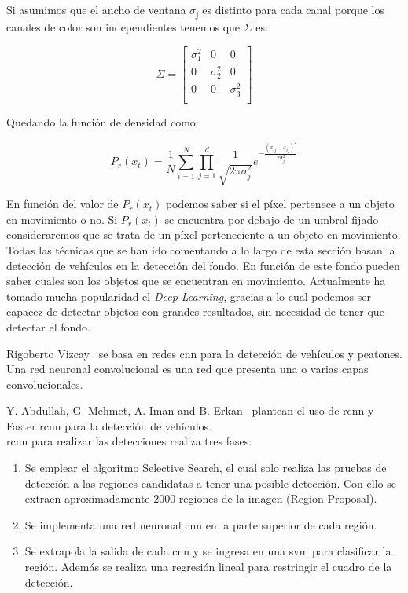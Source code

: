 Si asumimos que el ancho de ventana $\sigma$\textsubscript{j} es distinto para cada canal porque los canales de color son independientes tenemos que $\Sigma$ es:

\begin{equation}\label{matriz_sigma}
   \Sigma = \begin{bmatrix}
            \sigma_{1}^2 & 0 & 0 \\
            0 & \sigma_{2}^2 & 0 \\
            0 & 0 & \sigma_{3}^2 \\
\end{bmatrix}
\end{equation}

Quedando la función de densidad como:

\begin{equation}\label{funcion_densidad}
{P}_{r}(x_{t}) = \frac{1}{N}\sum_{i=1}^{N}\prod_{j=1}^{d}\frac{1}{\sqrt{2\pi\sigma_{j}^2}} e^{-\frac{(x_{tj}-x_{ij})^2}{2\sigma_{j}^2}}
\end{equation}

En función del valor de $P_{
r}(x_{t})$ podemos saber si el píxel pertenece a un objeto en movimiento o no. Si  $P_{
r}(x_{t})$ se encuentra por debajo de un umbral fijado consideraremos que se trata de un píxel perteneciente a un objeto en movimiento.
\\

Todas las técnicas que se han ido comentando a lo largo de esta sección basan la detección de vehículos en la detección del fondo. En función de este fondo pueden saber cuales son los objetos que se encuentran en movimiento. Actualmente ha tomado mucha popularidad el \textit{Deep Learning}, gracias a lo cual podemos ser capacez de detectar objetos con grandes resultados, sin necesidad de tener que detectar el fondo. 

Rigoberto Vizcay~\cite{tesis_rigoberto} se basa en redes \acrfull{cnn} para la detección de vehículos y peatones. Una red neuronal convolucional es una red que presenta una o varias capas convolucionales.

Y. Abdullah, G. Mehmet, A. Iman and B. Erkan~\cite{rcnn_detection}  plantean el uso de \acrfull{rcnn} y Faster \acrshort{rcnn} para la detección de vehículos. 
\\

\acrshort{rcnn} para realizar las detecciones realiza tres fases:
\begin{enumerate}
    \item Se emplear el algoritmo Selective Search, el cual solo realiza las pruebas de detección a las regiones candidatas a tener una posible detección. Con ello se extraen aproximadamente 2000 regiones de la imagen (Region Proposal).
    \item Se implementa una red neuronal \acrfull{cnn} en la parte superior de cada región.
    \item Se extrapola la salida de cada \acrshort{cnn} y se ingresa en una \acrfull{svm} para clasificar la región. Además se realiza una regresión lineal para restringir el cuadro de la detección.
\end{enumerate}

